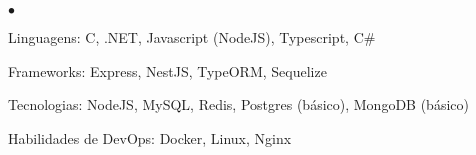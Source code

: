 \documentclass[margin,line]{res}
\newenvironment{list2}{
 \begin{list}{$\bullet$}{%
     \setlength{\itemsep}{0in}
     \setlength{\parsep}{0in} \setlength{\parskip}{0in}
     \setlength{\topsep}{0in} \setlength{\partopsep}{0in}
     \setlength{\leftmargin}{0.2in}}}{\end{list}}
\begin{document}
\begin{resume}
\begin{list2}
\item Linguagens: C, .NET, Javascript (NodeJS), Typescript, C\#

\item Frameworks: Express, NestJS, TypeORM, Sequelize

\item Tecnologias: NodeJS, MySQL, Redis, Postgres (básico), MongoDB (básico)

\item Habilidades de DevOps: Docker, Linux, Nginx
\end{list2}
\end{resume}
\end{document}
